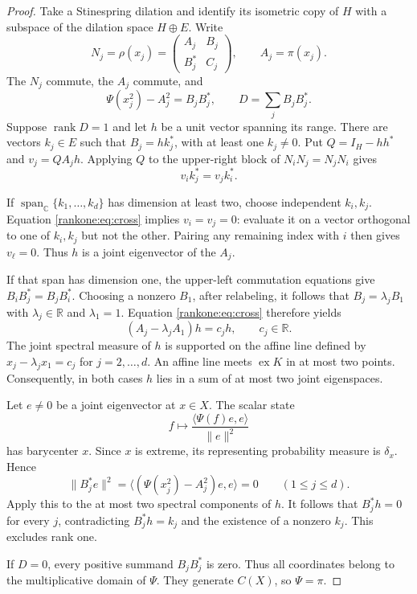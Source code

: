 \documentclass[11pt,letterpaper]{amsart}
\theoremstyle{definition}
\theoremstyle{remark}
\numberwithin{equation}{section}
\DeclareMathOperator{\rank}{rank}
\newcommand{\R}{\mathbb R}
\newcommand{\C}{\mathbb C}
\begin{document}
\begin{proof}
Take a Stinespring dilation and identify its isometric copy of $H$
with a subspace of the dilation space $H\oplus E$. Write
\[
 N_j=\rho(x_j)=
 \begin{pmatrix}A_j&B_j\\ B_j^*&C_j\end{pmatrix},
 \qquad A_j=\pi(x_j).
\]
The $N_j$ commute, the $A_j$ commute, and
\[
 \Psi(x_j^2)-A_j^2=B_jB_j^*,
 \qquad D=\sum_jB_jB_j^*.
\]
Suppose $\rank D=1$ and let $h$ be a unit vector spanning its range.
There are vectors $k_j\in E$ such that $B_j=hk_j^*$, with at least
one $k_j\ne0$. Put $Q=I_H-hh^*$ and $v_j=QA_jh$.
Applying $Q$ to the upper-right block of $N_iN_j=N_jN_i$ gives
\begin{equation}
                 v_i k_j^*=v_j k_i^*.
\label{rankone:eq:cross}
\end{equation}

If $\operatorname{span}_{\C}\{k_1,\ldots,k_d\}$ has dimension at
least two, choose independent $k_i,k_j$. Equation
\eqref{rankone:eq:cross} implies $v_i=v_j=0$: evaluate it on a
vector orthogonal to one of $k_i,k_j$ but not the other.
Pairing any remaining index with $i$ then gives $v_\ell=0$.
Thus $h$ is a joint eigenvector of the $A_j$.

If that span has dimension one, the upper-left commutation
equations give $B_iB_j^*=B_jB_i^*$. Choosing a nonzero $B_1$,
after relabeling, it follows that
$B_j=\lambda_jB_1$ with $\lambda_j\in\R$ and $\lambda_1=1$.
Equation \eqref{rankone:eq:cross} therefore yields
\[
       (A_j-\lambda_jA_1)h=c_jh,
       \qquad c_j\in\R.
\]
The joint spectral measure of $h$ is supported on the affine line
defined by $x_j-\lambda_jx_1=c_j$ for $j=2,\ldots,d$.
An affine line meets $\operatorname{ex}K$ in at most two points.
Consequently, in both cases $h$ lies in a sum of at most two joint
eigenspaces.

Let $e\ne0$ be a joint eigenvector at $x\in X$. The scalar state
\[
       f\longmapsto
       \frac{\langle\Psi(f)e,e\rangle}{\|e\|^2}
\]
has barycenter $x$. Since $x$ is extreme, its representing
probability measure is $\delta_x$. Hence
\[
 \|B_j^*e\|^2
 =\langle(\Psi(x_j^2)-A_j^2)e,e\rangle=0
 \qquad(1\le j\le d).
\]
Apply this to the at most two spectral components of $h$.
It follows that $B_j^*h=0$ for every $j$, contradicting
$B_j^*h=k_j$ and the existence of a nonzero $k_j$.
This excludes rank one.

If $D=0$, every positive summand $B_jB_j^*$ is zero. Thus all
coordinates belong to the multiplicative domain of $\Psi$.
They generate $C(X)$, so $\Psi=\pi$.
\end{proof}
\end{document}
